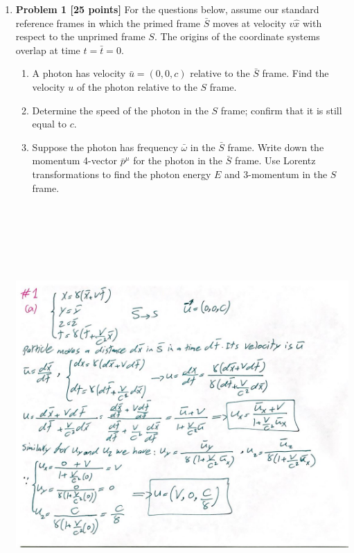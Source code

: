 \documentclass[fleqn]{article}
\begin{document}
  \begin{enumerate}
    \item \textbf{Problem 1 [25 points]}
    For the questions below, assume our standard reference frames in which the primed frame $\bar{S}$
    moves at velocity $v \hat{x}$ with respect to the unprimed frame $S$. The origins of the coordinate 
    systems overlap at time $t=\bar{t}=0$.
    \begin{enumerate}
      \item A photon has velocity $\bar{u}=(0,0,c)$ relative to the $\bar{S}$ frame. Find the velocity $u$
      of the photon relative to the $S$ frame.

      \item Determine the speed of the photon in the $S$ frame; confirm that it is still equal to $c$.

      \item Suppose the photon has frequency $\bar{\omega}$ in the $\bar{S}$ frame. Write down the momentum
      4-vector $\bar{p}^{\mu}$ for the photon in the $\bar{S}$ frame. Use Lorentz transformations to find the 
      photon energy $E$ and 3-momentum in the $S$ frame.
    \end{enumerate}


    \begin{center}
      \includegraphics[height=16cm, width=17cm]{1A.JPG}
    \end{center}


\end{enumerate}
\end{document}
